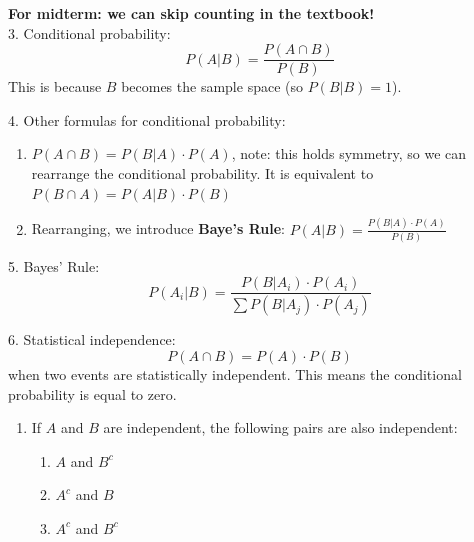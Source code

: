\documentclass{article}
\begin{document}
\textbf{For midterm: we can skip counting in the textbook!} \\ 
\vspace{3mm}
3. Conditional probability: 
\[
P(A|B) = \frac{P(A \cap B)}{P(B)}
\]
This is because \(B\) becomes the sample space (so \(P(B|B) = 1\)).

4. Other formulas for conditional probability:
   \begin{enumerate}
       \item \(P(A \cap B) = P(B|A) \cdot P(A)\), note: this holds symmetry, so we can rearrange the conditional probability. It is equivalent to \(P(B \cap A) = P(A|B) \cdot P(B)\)
       \item Rearranging, we introduce \textbf{Baye's Rule}: \(P(A | B) = \frac{P(B|A) \cdot P(A)}{P(B)}\)
   \end{enumerate}

5. Bayes' Rule:
\[
P(A_i|B) = \frac{P(B|A_i) \cdot P(A_i)}{\sum P(B|A_j) \cdot P(A_j)}
\]

6. Statistical independence: 
\[
P(A \cap B) = P(A) \cdot P(B)
\]
when two events are statistically independent. This means the conditional probability is equal to zero.
   \begin{enumerate}
       \item If \(A\) and \(B\) are independent, the following pairs are also independent: 
           \begin{enumerate}
               \item \(A\) and \(B^c\)
               \item \(A^c\) and \(B\)
               \item \(A^c\) and \(B^c\)
           \end{enumerate}
   \end{enumerate}
\end{document}
